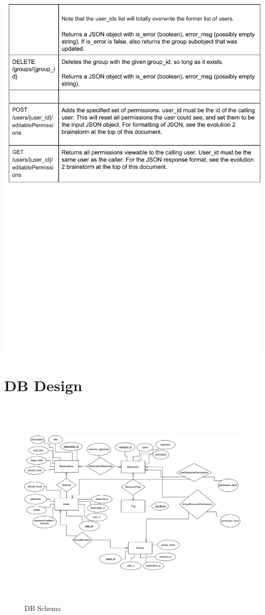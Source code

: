 \documentclass[12pt]{article}
\begin{document}
\includegraphics[width=6in]{apispec_06.pdf}

\clearpage
\section{DB Design}
\label{appendix:DBDesign}
\begin{figure}[h]
\begin{center}
\includegraphics[height=4in]{Evolution3DB.pdf}
\end{center}
\caption{DB Schema}
\end{figure}
\end{document}
